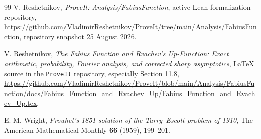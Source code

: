 \documentclass[11pt,oneside]{article}
\theoremstyle{definition}
\theoremstyle{remark}
\newcommand{\1}{\mathbf 1}
\begin{document}
\begin{thebibliography}{99}
V. Reshetnikov,
\emph{ProveIt: Analysis/FabiusFunction}, active Lean formalization repository,
\url{https://github.com/VladimirReshetnikov/ProveIt/tree/main/Analysis/FabiusFunction},
repository snapshot 25 August 2026.

V. Reshetnikov,
\emph{The Fabius Function and Rvachev's Up-Function: Exact arithmetic, probability, Fourier
analysis, and corrected sharp asymptotics},
LaTeX source in the \texttt{ProveIt} repository, especially Section 11.8,
\url{https://github.com/VladimirReshetnikov/ProveIt/blob/main/Analysis/FabiusFunction/docs/Fabius_Function_and_Rvachev_Up/Fabius_Function_and_Rvachev_Up.tex}.

E. M. Wright,
\emph{Prouhet's 1851 solution of the Tarry--Escott problem of 1910},
The American Mathematical Monthly \textbf{66} (1959), 199--201.

\end{thebibliography}
\end{document}
